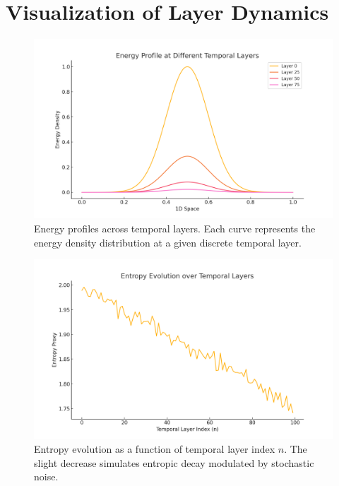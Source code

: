 
\section{Visualization of Layer Dynamics}

\begin{figure}[h!]
\centering
\includegraphics[width=0.9\linewidth]{05_Simulations/energy_profiles.png}
\caption{Energy profiles across temporal layers. Each curve represents the energy density distribution at a given discrete temporal layer.}\label{fig:interactivitystate}
\end{figure}

\begin{figure}[h!]
\centering
\includegraphics[width=0.9\linewidth]{05_Simulations/entropy_evolution.png}
\caption{Entropy evolution as a function of temporal layer index $n$. The slight decrease simulates entropic decay modulated by stochastic noise.}
\end{figure}

